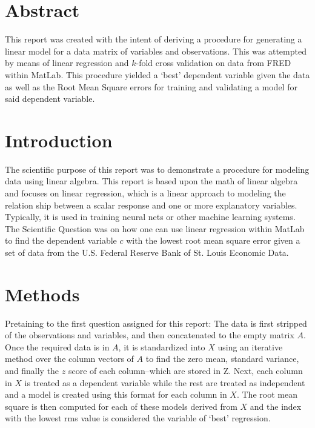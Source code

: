 \documentclass[12pt]{book}
\title{\coursetitle\linebreak\lecturename}
\author{\\Cain Susko\\ 
        20244352\\
           \\ \\ \\
      Queen's University 
    \\School of Computing\\}
\begin{document}
\begin{titlepage}
        \maketitle
\end{titlepage}


\section*{Abstract}
This report was created with the intent of deriving a procedure for generating a linear model for a data matrix of variables and 
        observations.
This was attempted by means of linear regression and $k$-fold cross validation on data from FRED within MatLab.
This procedure yielded a `best' dependent variable given the data as well as the Root Mean Square errors for training and validating
        a model for said dependent variable.

\section*{Introduction}
The scientific purpose of this report was to demonstrate a procedure for modeling data using linear algebra. 
This report is based upon the math of linear algebra and focuses on linear regression, which is a linear 
approach to modeling the relation ship between a scalar response and one or more explanatory variables.
Typically, it is used in training neural nets or other machine learning systems.
The Scientific Question was on how one can use linear regression within MatLab to find the dependent variable $c$ with the 
 lowest root mean square error given a set of data from the U.S. Federal Reserve Bank of St. Louis Economic Data.

\section*{Methods}
Pretaining to the first question assigned for this report: The data is first stripped of the observations and variables, and then 
concatenated to the empty matrix $A$. Once the required data is in $A$,  it is standardized into $X$ using an iterative method over
the column vectors of $A$ to find the zero mean, standard variance, and finally the $z$ score of each column--which are stored in Z. 
Next, each column in $X$ is treated as a dependent variable while the rest are treated as independent and a model is created using
this format for each column in $X$. 
The root mean square is then computed for each of these models derived from $X$ and the index with the lowest rms value is considered
the variable of `best' regression.
\end{document}
